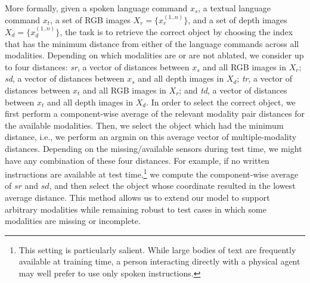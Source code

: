 \documentclass[sigconf,natbib=true,anonymous=true]{acmart}
\begin{document}

More formally, given a spoken language command $x_s$, a textual language command $x_t$, a set of RGB images $X_r = \{x_r^{(1..n)}\}$, and a set of depth images $X_d = \{x_d^{(1..n)}\}$, the task is to retrieve the correct object by choosing the index that has the minimum distance from either of the language commands across all modalities.
Depending on which modalities are or are not ablated, we consider up to four distances: \textit{sr}, a vector of distances between $x_s$ and all RGB images in $X_r$; \textit{sd}, a vector of distances between $x_s$ and all depth images in $X_d$; \textit{tr}, a vector of distances between $x_t$ and all RGB images in $X_r$; and \textit{td}, a vector of distances between $x_t$ and all depth images in $X_d$. In order to select the correct object, we first perform a component-wise average of the relevant modality pair distances for the available modalities. Then, we select the object which had the minimum distance, i.e., we perform an argmin on this average vector of multiple-modality distances. Depending on the missing/available sensors during test time, we might have any combination of these four distances. For example, if no written instructions are available at test time,\footnote{This setting is particularly salient. While large bodies of text are frequently available at training time, a person interacting directly with a physical agent may well prefer to use only spoken instructions.} we compute the component-wise average of $sr$ and $sd$, and then select the object whose coordinate resulted in the lowest average distance. This method allows us to extend our model to support arbitrary modalities while remaining robust to test cases in which some modalities are missing or incomplete. 
\end{document}
